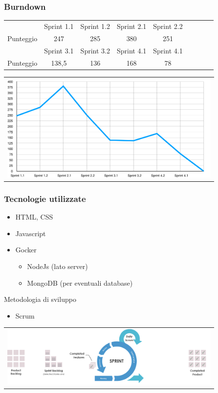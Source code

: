\documentclass{beamer}
\begin{document}
\begin{frame}
\frametitle{Burndown}
\centering
\begin{tabular}{|c|c|c|c|c|c|c|c|c|}
\hline
					& Sprint 1.1	& Sprint 1.2	&Sprint 2.1	&Sprint 2.2	\\
Punteggio		& 247			& 285			& 380			& 251			\\
\hline
					&Sprint 3.1	&Sprint 3.2	&Sprint 4.1	&Sprint 4.1    \\
Punteggio 	& 138,5			& 136			& 168			& 78 			 	 \\
\hline
\end{tabular}
 \centering
        \begin{tabular}{c}
        \includegraphics[width=11cm]{../burndown/burndown_slides.png}
      \end{tabular}
\end{frame}

\begin{frame}
\frametitle{Tecnologie utilizzate}
\begin{itemize}
  \item HTML, CSS
  \item Javascript
  \item Gocker
  \begin{itemize}
  \item NodeJs (lato server)
  \item MongoDB (per eventuali database)
\end{itemize}
\end{itemize}
Metodologia di sviluppo
  \begin{itemize}
  \item Scrum
\end{itemize}
      \centering  \begin{tabular}{c}
        \includegraphics[width=11cm]{Images/scrum/scrum-sprint}
      \end{tabular}
\end{frame}
\end{document}
